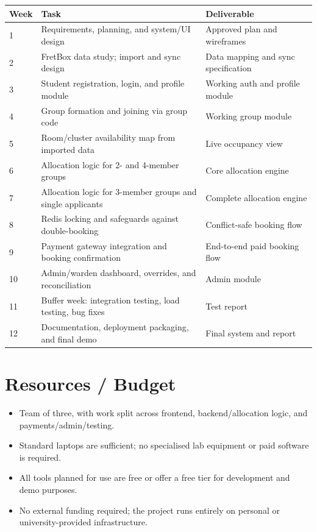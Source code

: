 \documentclass[11pt]{article}
\begin{document}
\begin{longtable}{p{1cm}p{6.3cm}p{6.5cm}}
\toprule
\textbf{Week} & \textbf{Task} & \textbf{Deliverable} \\
\midrule
\endhead
1  & Requirements, planning, and system/UI design & Approved plan and wireframes \\
2  & FretBox data study; import and sync design & Data mapping and sync specification \\
3  & Student registration, login, and profile module & Working auth and profile module \\
4  & Group formation and joining via group code & Working group module \\
5  & Room/cluster availability map from imported data & Live occupancy view \\
6  & Allocation logic for 2- and 4-member groups & Core allocation engine \\
7  & Allocation logic for 3-member groups and single applicants & Complete allocation engine \\
8  & Redis locking and safeguards against double-booking & Conflict-safe booking flow \\
9  & Payment gateway integration and booking confirmation & End-to-end paid booking flow \\
10 & Admin/warden dashboard, overrides, and reconciliation & Admin module \\
11 & Buffer week: integration testing, load testing, bug fixes & Test report \\
12 & Documentation, deployment packaging, and final demo & Final system and report \\
\bottomrule
\end{longtable}

\section{Resources / Budget}
\begin{itemize}[leftmargin=1.2cm]
    \item Team of three, with work split across frontend, backend/allocation logic, and payments/admin/testing.
    \item Standard laptops are sufficient; no specialised lab equipment or paid software is required.
    \item All tools planned for use are free or offer a free tier for development and demo purposes.
    \item No external funding required; the project runs entirely on personal or university-provided infrastructure.
\end{itemize}
\end{document}

